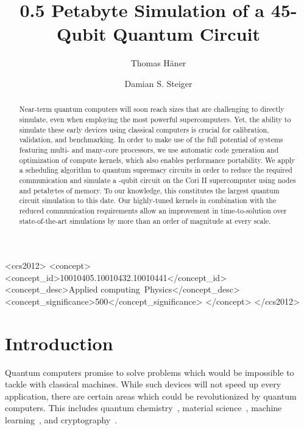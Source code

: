 \documentclass[sigconf]{acmart}
\begin{document}
\title{0.5 Petabyte Simulation of a 45-Qubit Quantum Circuit}



\author{Thomas H\"aner}
\author{Damian S. Steiger}



\begin{abstract}
Near-term quantum computers will soon reach sizes that are challenging to directly simulate, even when employing the most powerful supercomputers. Yet, the ability to simulate these early devices using classical computers is crucial for calibration, validation, and benchmarking. In order to make use of the full potential of systems featuring multi- and many-core processors, we use automatic code generation and optimization of compute kernels, which also enables performance portability. We apply a scheduling algorithm to quantum supremacy circuits in order to reduce the required communication and simulate a -qubit circuit on the Cori II supercomputer using  nodes and  petabytes of memory. To our knowledge, this constitutes the largest quantum circuit simulation to this date. Our highly-tuned kernels in combination with the reduced communication requirements allow an improvement in time-to-solution over state-of-the-art simulations by more than an order of magnitude at every scale.
\end{abstract}

\begin{CCSXML}
<ccs2012>
<concept>
<concept_id>10010405.10010432.10010441</concept_id>
<concept_desc>Applied computing~Physics</concept_desc>
<concept_significance>500</concept_significance>
</concept>
</ccs2012>
\end{CCSXML}


 \renewcommand\footnotetextcopyrightpermission[1]{} \pagestyle{plain} 

\maketitle


\section{Introduction}
Quantum computers promise to solve problems which would be impossible to tackle with classical machines. While such devices will not speed up every application, there are certain areas which could be revolutionized by quantum computers. This includes quantum chemistry~\cite{aspuru2005simulated,babbush2015chemical,reiher2016}, material science~\cite{bauer2015hybrid}, machine learning~\cite{harrow2009,wiebe2012,lloyd2013,rebentrost2014}, and cryptography~\cite{shor94}. 
\end{document}
